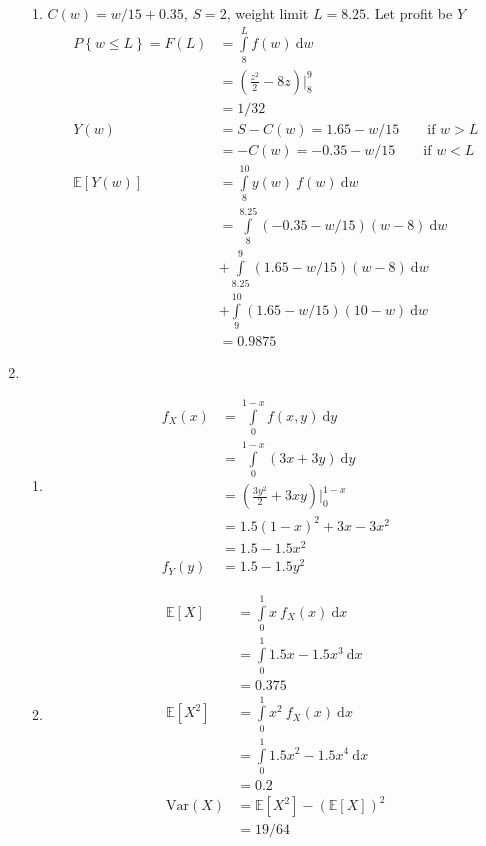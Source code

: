\begin{enumerate}
\begin{enumerate}
			\item $ C(w) = w/15 + 0.35 $, $ S = 2 $, weight limit $ L = 8.25 $. Let profit be $ Y $\\
			\begin{align}
				P\left\{w \leq L\right\} = F(L) &= \int\limits_{8}^{L} f(w)\ \mathrm{d}w \nonumber \\
				&= \left(\frac{z^2}{2} - 8z\right) \Big|_8^9 \nonumber \\
				&=  1/32\\
				Y(w) &= S - C(w) = 1.65 - w/15  \qquad \text{if } w > L\nonumber \\
				&= - C(w) = -0.35 - w/15  \qquad \text{if } w < L\nonumber \\
				\mathbb{E}[Y(w)] &= \int\limits_{8}^{10} y(w)\ f(w)\ \mathrm{d}w \nonumber \\
				&= \int\limits_{8}^{8.25} (-0.35-w/15)(w-8)\ \mathrm{d}w \nonumber \\
				&+ \int\limits_{8.25}^{9} (1.65 - w/15)(w-8)\ \mathrm{d}w \nonumber \\
				&+ \int\limits_{9}^{10} (1.65-w/15)(10-w)\ \mathrm{d}w \\
				&= 0.9875 
			\end{align}
		\end{enumerate}
	
	
	\item 
		\begin{enumerate}
			
			\item \begin{align}
				f_X (x) &= \int\limits_{0}^{1-x} f(x, y)\ \mathrm{d}y \nonumber \\
				&= \int\limits_{0}^{1-x} (3x + 3y)\ \mathrm{d}y\nonumber \\
				&= \left(\frac{3y^2}{2} + 3xy\right) \Big|_0^{1-x} \\
				&= 1.5 (1-x)^2 + 3x - 3x^2 \nonumber \\
				&= 1.5 - 1.5x^2 \\
				f_Y (y) &= 1.5 - 1.5y^2
			\end{align}
			
			\item \begin{align}
				\mathbb{E}[X] &= \int\limits_{0}^{1} x\ f_X (x)\ \mathrm{d}x \nonumber \\
				&= \int\limits_{0}^{1} 1.5x - 1.5x^3\ \mathrm{d}x \nonumber \\
				&= 0.375 \\
				\mathbb{E}[X^2] &= \int\limits_{0}^{1} x^2\ f_X (x)\ \mathrm{d}x \nonumber \\
				&= \int\limits_{0}^{1} 1.5x^2 - 1.5x^4\ \mathrm{d}x \nonumber \\
				&= 0.2 \\
				\mathrm{Var}(X) &= \mathbb{E}[X^2]- (\mathbb{E}[X])^2 \nonumber \\
				&= 19/64
			\end{align}
		\end{enumerate}
	

\end{enumerate}
